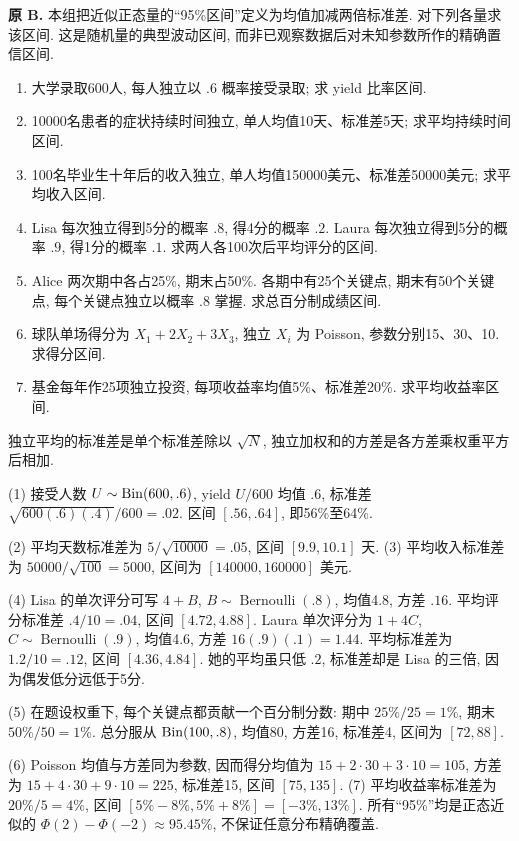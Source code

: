 \begin{exercise}\label{ex:P9.B}
\textbf{原 B.} 本组把近似正态量的“95\%区间”定义为均值加减两倍标准差. 对下列各量求该区间. 这是随机量的典型波动区间, 而非已观察数据后对未知参数所作的精确置信区间.
\begin{enumerate}[label=\arabic*.]
\item\label{part:P9.B.1} 大学录取600人, 每人独立以 $.6$ 概率接受录取; 求 yield 比率区间.
\item\label{part:P9.B.2} 10000名患者的症状持续时间独立, 单人均值10天、标准差5天; 求平均持续时间区间.
\item\label{part:P9.B.3} 100名毕业生十年后的收入独立, 单人均值150000美元、标准差50000美元; 求平均收入区间.
\item\label{part:P9.B.4} Lisa 每次独立得到5分的概率 $.8$, 得4分的概率 $.2$. Laura 每次独立得到5分的概率 $.9$, 得1分的概率 $.1$. 求两人各100次后平均评分的区间.
\item\label{part:P9.B.5} Alice 两次期中各占25\%, 期末占50\%. 各期中有25个关键点, 期末有50个关键点, 每个关键点独立以概率 $.8$ 掌握. 求总百分制成绩区间.
\item\label{part:P9.B.6} 球队单场得分为 $X_1+2X_2+3X_3$, 独立 $X_i$ 为 Poisson, 参数分别15、30、10. 求得分区间.
\item\label{part:P9.B.7} 基金每年作25项独立投资, 每项收益率均值5\%、标准差20\%. 求平均收益率区间.
\end{enumerate}
\end{exercise}
\begin{solution}\label{sol:P9.B}
独立平均的标准差是单个标准差除以 $\sqrt N$, 独立加权和的方差是各方差乘权重平方后相加.

(1) 接受人数 $U\sim\operatorname{Bin}(600,.6)$, yield $U/600$ 均值 $.6$, 标准差 $\sqrt{600(.6)(.4)}/600=.02$. 区间 $[.56,.64]$, 即56\%至64\%.

(2) 平均天数标准差为 $5/\sqrt{10000}=.05$, 区间 $[9.9,10.1]$ 天. (3) 平均收入标准差为 $50000/\sqrt{100}=5000$, 区间为 $[140000,160000]$ 美元.

(4) Lisa 的单次评分可写 $4+B$, $B\sim\operatorname{Bernoulli}(.8)$, 均值4.8, 方差 $.16$. 平均评分标准差 $.4/10=.04$, 区间 $[4.72,4.88]$. Laura 单次评分为 $1+4C$, $C\sim\operatorname{Bernoulli}(.9)$, 均值4.6, 方差 $16(.9)(.1)=1.44$. 平均标准差为 $1.2/10=.12$, 区间 $[4.36,4.84]$. 她的平均虽只低 $.2$, 标准差却是 Lisa 的三倍, 因为偶发低分远低于5分.

(5) 在题设权重下, 每个关键点都贡献一个百分制分数: 期中 $25\%/25=1\%$, 期末 $50\%/50=1\%$. 总分服从 $\operatorname{Bin}(100,.8)$, 均值80, 方差16, 标准差4, 区间为 $[72,88]$.

(6) Poisson 均值与方差同为参数, 因而得分均值为 $15+2\cdot30+3\cdot10=105$, 方差为 $15+4\cdot30+9\cdot10=225$, 标准差15, 区间 $[75,135]$. (7) 平均收益率标准差为 $20\%/5=4\%$, 区间 $[5\%-8\%,5\%+8\%]=[-3\%,13\%]$. 所有“95\%”均是正态近似的 $\Phi(2)-\Phi(-2)\approx95.45\%$, 不保证任意分布精确覆盖.
\end{solution}

